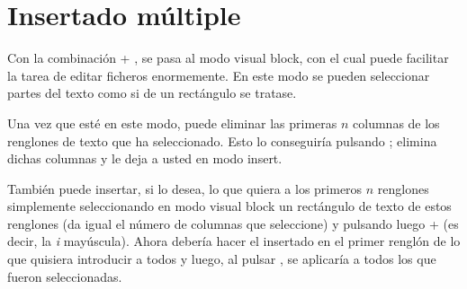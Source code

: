 \section{Insertado múltiple}\label{sec:vim-ins-mul}
Con la combinación  + , se pasa al modo visual block, con el cual puede facilitar la tarea
de editar ficheros enormemente. En este modo se pueden seleccionar partes del texto como si de un rectángulo se
tratase.

Una vez que esté en este modo, puede eliminar las primeras \(n\) columnas de los renglones de texto que ha
seleccionado. Esto lo conseguiría pulsando ; elimina dichas columnas y le deja a usted en modo insert.

También puede insertar, si lo desea, lo que quiera a los primeros \(n\) renglones simplemente seleccionando en
modo visual block un rectángulo de texto de estos renglones (da igual el número de columnas que seleccione) y
pulsando luego \tecla{\(\Uparrow\)} +  (es decir, la \emph{i} mayúscula). Ahora debería hacer el
insertado en el primer renglón de lo que quisiera introducir a todos y luego, al pulsar , se
aplicaría a todos los que fueron seleccionadas.

